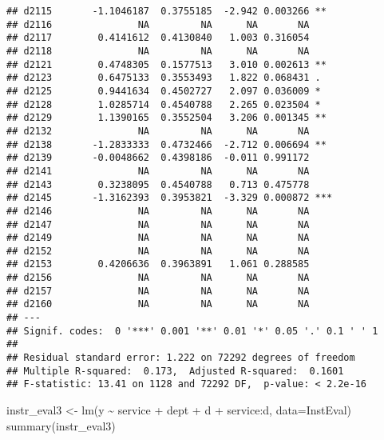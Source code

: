 \documentclass[
]{article}
\newenvironment{Shaded}{\begin{snugshade}}{\end{snugshade}}
\newcommand{\AttributeTok}[1]{\textcolor[rgb]{0.77,0.63,0.00}{#1}}
\newcommand{\FunctionTok}[1]{\textcolor[rgb]{0.00,0.00,0.00}{#1}}
\newcommand{\NormalTok}[1]{#1}
\newcommand{\OtherTok}[1]{\textcolor[rgb]{0.56,0.35,0.01}{#1}}
\newcommand{\SpecialCharTok}[1]{\textcolor[rgb]{0.00,0.00,0.00}{#1}}
\begin{document}
\begin{verbatim}
## d2115       -1.1046187  0.3755185  -2.942 0.003266 ** 
## d2116               NA         NA      NA       NA    
## d2117        0.4141612  0.4130840   1.003 0.316054    
## d2118               NA         NA      NA       NA    
## d2121        0.4748305  0.1577513   3.010 0.002613 ** 
## d2123        0.6475133  0.3553493   1.822 0.068431 .  
## d2125        0.9441634  0.4502727   2.097 0.036009 *  
## d2128        1.0285714  0.4540788   2.265 0.023504 *  
## d2129        1.1390165  0.3552504   3.206 0.001345 ** 
## d2132               NA         NA      NA       NA    
## d2138       -1.2833333  0.4732466  -2.712 0.006694 ** 
## d2139       -0.0048662  0.4398186  -0.011 0.991172    
## d2141               NA         NA      NA       NA    
## d2143        0.3238095  0.4540788   0.713 0.475778    
## d2145       -1.3162393  0.3953821  -3.329 0.000872 ***
## d2146               NA         NA      NA       NA    
## d2147               NA         NA      NA       NA    
## d2149               NA         NA      NA       NA    
## d2152               NA         NA      NA       NA    
## d2153        0.4206636  0.3963891   1.061 0.288585    
## d2156               NA         NA      NA       NA    
## d2157               NA         NA      NA       NA    
## d2160               NA         NA      NA       NA    
## ---
## Signif. codes:  0 '***' 0.001 '**' 0.01 '*' 0.05 '.' 0.1 ' ' 1
## 
## Residual standard error: 1.222 on 72292 degrees of freedom
## Multiple R-squared:  0.173,  Adjusted R-squared:  0.1601 
## F-statistic: 13.41 on 1128 and 72292 DF,  p-value: < 2.2e-16
\end{verbatim}

\begin{Shaded}
\begin{Highlighting}[]
\NormalTok{instr\_eval3 }\OtherTok{\textless{}{-}} \FunctionTok{lm}\NormalTok{(y }\SpecialCharTok{\textasciitilde{}}\NormalTok{ service }\SpecialCharTok{+}\NormalTok{ dept }\SpecialCharTok{+}\NormalTok{ d }\SpecialCharTok{+}\NormalTok{ service}\SpecialCharTok{:}\NormalTok{d, }\AttributeTok{data=}\NormalTok{InstEval)}
\FunctionTok{summary}\NormalTok{(instr\_eval3)}
\end{Highlighting}
\end{Shaded}
\end{document}
